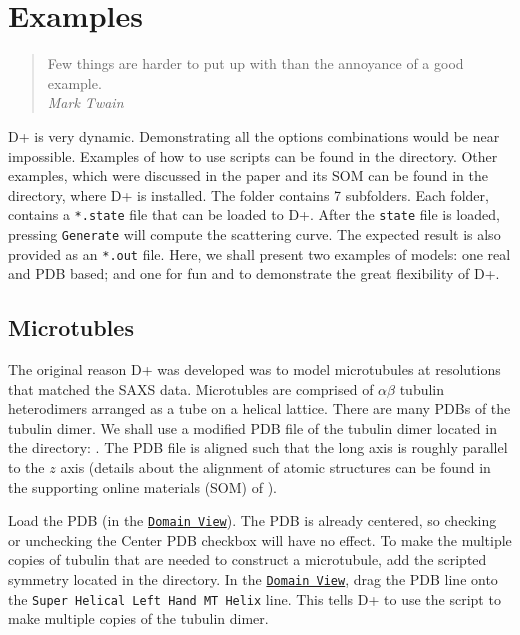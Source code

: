 \documentclass[../D+Manual.tex]{subfiles}
\begin{document}
\chapter{Examples} \label{chp:examples}

\begin{quote}
	Few things are harder to put up with than the annoyance of a good example.\\
	\hspace*{\fill} \textit{Mark Twain}
\end{quote}

D+ is very dynamic. Demonstrating all the options combinations would be near impossible. Examples of how to use scripts can be found in the  directory. Other examples, which were discussed in the paper and its SOM can be found in the  directory, where D+ is installed. The folder contains 7 subfolders. Each folder, contains a \texttt{*.state} file that can be loaded to D+. After the \texttt{state} file is loaded, pressing \texttt{Generate} will compute the scattering curve.  The expected result is also provided as an \texttt{*.out} file. Here, we shall present two examples of models: one real and PDB based; and one for fun and to demonstrate the great flexibility of D+.

\section{Microtubles}

The original reason D+ was developed was to model microtubules at resolutions that matched the SAXS data.
Microtubles are comprised of $\alpha\beta$ tubulin heterodimers arranged as a tube on a helical lattice.
There are many PDBs of the tubulin dimer.
We shall use a modified PDB file of the tubulin dimer located in the  directory: .
The PDB file is aligned such that the long axis is roughly parallel to the $z$ axis (details about the alignment of atomic structures can be found in the supporting online materials (SOM) of  \cite{Dplus2017}).

Load the PDB (in the \hyperref[sec:domainView]{\texttt{Domain View}}).
The PDB is already centered, so checking or unchecking the Center PDB checkbox will have no effect.
To make the multiple copies of tubulin that are needed to construct a microtubule, add the  scripted symmetry located in the  directory. In the \hyperref[sec:domainView]{\texttt{Domain View}}, drag the PDB line onto the \texttt{Super Helical Left Hand MT Helix} line. This tells D+ to use the script to make multiple copies of the tubulin dimer.
\end{document}
